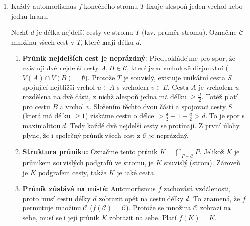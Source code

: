\documentclass[12pt]{article}
\begin{document}
\begin{enumerate}
\begin{enumerate}
\begin{itemize}
          \item Podstrom $T_i$ je souvislý, musí tedy obsahovat cestu z vrcholu $u$ do vrcholu $w$. Protože tato cesta vede z "vnějšku" do $T_{n+1}$, musí nutně procházet přes vstupní vrchol $v$.
          
          \item Z toho plyne, že $v \in T_i$.
      \end{itemize}

      Protože předchozí úvaha platí pro všechna $i = 1, \dots, n$, musí vrchol $v$ ležet v průniku všech těchto podstromů, tedy $v \in P$.

      Zároveň však z konstrukce víme, že $v \in T_{n+1}$. Tedy $v$ je společným bodem $P$ a $T_{n+1}$, což je spor s předpokladem, že jsou množiny disjunktní. $\quad\square$
    \end{enumerate}

  \setcounter{enumi}{0}
  \item Každý automorfismus $f$ konečného stromu $T$ fixuje alespoň jeden vrchol nebo jednu hranu.

  Nechť $d$ je délka nejdelší cesty ve stromu $T$ (tzv. průměr stromu). Označme $\mathcal{C}$ množinu všech cest v $T$, které mají délku $d$.

  \begin{enumerate}
      \item \textbf{Průnik nejdelších cest je neprázdný:}
      Předpokládejme pro spor, že existují dvě nejdelší cesty $A, B \in \mathcal{C}$, které jsou vrcholově disjunktní ($V(A) \cap V(B) = \emptyset$).
      Protože $T$ je souvislý, existuje unikátní cesta $S$ spojující nejbližší vrchol $u \in A$ s vrcholem $v \in B$.
      Cesta $A$ je vrcholem $u$ rozdělena na dvě části, z nichž alespoň jedna má délku $\ge \frac{d}{2}$. Totéž platí pro cestu $B$ a vrchol $v$.
      Složením těchto dvou částí a spojovací cesty $S$ (která má délku $\ge 1$) získáme cestu o délce $> \frac{d}{2} + 1 + \frac{d}{2} > d$. To je spor s maximalitou $d$.
      Tedy každé dvě nejdelší cesty se protínají. Z první úlohy plyne, že i společný průnik všech cest z $\mathcal{C}$ je neprázdný.

      \item \textbf{Struktura průniku:}
      Označme tento průnik $K = \bigcap_{P \in \mathcal{C}} P$.
      Jelikož $K$ je průnikem souvislých podgrafů ve stromu, je $K$ souvislý (strom). Zároveň je $K$ podgrafem cesty, takže $K$ je také cesta.

      \item \textbf{Průnik zůstává na místě:}
      Automorfismus $f$ zachovává vzdálenosti, proto musí cestu délky $d$ zobrazit opět na cestu délky $d$. To znamená, že $f$ permutuje množinu $\mathcal{C}$ ($f(\mathcal{C}) = \mathcal{C}$).
      Protože se množina $\mathcal{C}$ zobrazí na sebe, musí se i její průnik $K$ zobrazit na sebe. Platí $f(K) = K$.


\end{enumerate}
\end{enumerate}
\end{document}
